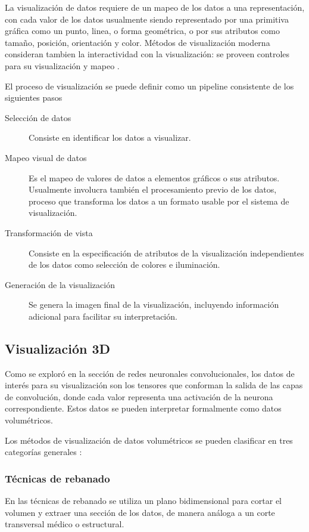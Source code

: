 La visualización de datos requiere de un mapeo de los datos a una representación, con cada valor
de los datos usualmente siendo representado por una primitiva gráfica como un punto, linea, o forma
geométrica, o por sus atributos como tamaño, posición, orientación y color. Métodos de
visualización moderna consideran tambien la interactividad con la visualización: se proveen controles
para su visualización y mapeo \parencite[p.30]{ward2010interactive}. %

El proceso de visualización se puede definir como un pipeline consistente de los siguientes pasos
\begin{description}
    \item[Selección de datos] Consiste en identificar los datos a visualizar.
    \item[Mapeo visual de datos] Es el mapeo de valores de datos a elementos gráficos o sus atributos.
    Usualmente involucra también el procesamiento previo de los datos, proceso que transforma los datos
    a un formato usable por el sistema de visualización.
    \item[Transformación de vista] Consiste en la especificación de atributos de la visualización
    independientes de los datos como selección de colores e iluminación.
    \item[Generación de la visualización] Se genera la imagen final de la visualización, incluyendo
    información adicional para facilitar su interpretación.
\end{description} \parencite[p.33]{ward2010interactive}

\subsection{Visualización 3D}
Como se exploró en la sección de redes neuronales convolucionales, los datos de interés para su visualización 
son los tensores que conforman la salida de las capas de convolución, donde cada valor representa
una activación de la neurona correspondiente. Estos datos se pueden interpretar formalmente como datos volumétricos.
\medskip

Los métodos de visualización de datos volumétricos se pueden clasificar en tres categorías generales 
\parencite[p.~195]{ward2010interactive}:

\subsubsection{Técnicas de rebanado}
En las técnicas de rebanado se utiliza un plano bidimensional para cortar el volumen y extraer una sección
de los datos, de manera análoga a un corte transversal médico o estructural.

